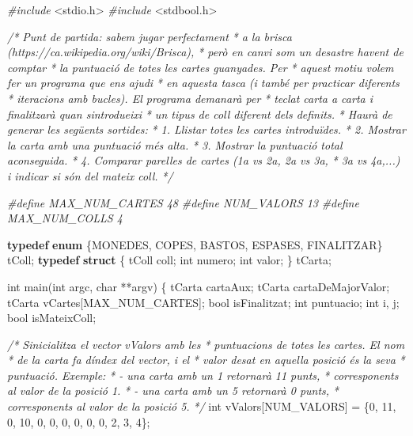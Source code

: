 \documentclass[
]{book}
\newenvironment{Shaded}{\begin{snugshade}}{\end{snugshade}}
\newcommand{\CommentTok}[1]{\textcolor[rgb]{0.56,0.35,0.01}{\textit{#1}}}
\newcommand{\DataTypeTok}[1]{\textcolor[rgb]{0.13,0.29,0.53}{#1}}
\newcommand{\DecValTok}[1]{\textcolor[rgb]{0.00,0.00,0.81}{#1}}
\newcommand{\ImportTok}[1]{#1}
\newcommand{\KeywordTok}[1]{\textcolor[rgb]{0.13,0.29,0.53}{\textbf{#1}}}
\newcommand{\NormalTok}[1]{#1}
\newcommand{\PreprocessorTok}[1]{\textcolor[rgb]{0.56,0.35,0.01}{\textit{#1}}}
\begin{document}
\begin{Shaded}
\begin{Highlighting}[]
\PreprocessorTok{\#include }\ImportTok{\textless{}stdio.h\textgreater{}}
\PreprocessorTok{\#include }\ImportTok{\textless{}stdbool.h\textgreater{}}

\CommentTok{/* Punt de partida: sabem jugar perfectament}
\CommentTok{ * a la brisca (https://ca.wikipedia.org/wiki/Brisca), }
\CommentTok{ * però en canvi som un desastre havent de comptar}
\CommentTok{ * la puntuació de totes les cartes guanyades. Per}
\CommentTok{ * aquest motiu volem fer un programa que ens ajudi}
\CommentTok{ * en aquesta tasca (i també per practicar diferents}
\CommentTok{ * iteracions amb bucles). El programa demanarà per }
\CommentTok{ * teclat carta a carta i finalitzarà quan s\textquotesingle{}introdueixi}
\CommentTok{ * un tipus de coll diferent dels definits.}
\CommentTok{ * Haurà de generar les següents sortides:}
\CommentTok{ * 1. Llistar totes les cartes introduïdes.}
\CommentTok{ * 2. Mostrar la carta amb una puntuació més alta.}
\CommentTok{ * 3. Mostrar la puntuació total aconseguida.}
\CommentTok{ * 4. Comparar parelles de cartes (1a vs 2a, 2a vs 3a,}
\CommentTok{ *    3a vs 4a,...) i indicar si són del mateix coll.}
\CommentTok{ */}

\PreprocessorTok{\#define MAX\_NUM\_CARTES 48}
\PreprocessorTok{\#define NUM\_VALORS 13}
\PreprocessorTok{\#define MAX\_NUM\_COLLS 4}

\KeywordTok{typedef} \KeywordTok{enum}\NormalTok{ \{MONEDES, COPES, BASTOS, ESPASES, FINALITZAR\} tColl;}
\KeywordTok{typedef} \KeywordTok{struct}\NormalTok{ \{}
\NormalTok{    tColl coll;}
    \DataTypeTok{int}\NormalTok{ numero;}
    \DataTypeTok{int}\NormalTok{ valor;}
\NormalTok{\} tCarta;}

\DataTypeTok{int}\NormalTok{ main(}\DataTypeTok{int}\NormalTok{ argc, }\DataTypeTok{char}\NormalTok{ **argv) \{}
\NormalTok{    tCarta cartaAux;}
\NormalTok{    tCarta cartaDeMajorValor;}
\NormalTok{    tCarta vCartes[MAX\_NUM\_CARTES];}
    \DataTypeTok{bool}\NormalTok{ isFinalitzat;}
    \DataTypeTok{int}\NormalTok{ puntuacio;}
    \DataTypeTok{int}\NormalTok{ i, j;}
    \DataTypeTok{bool}\NormalTok{ isMateixColl;}
    
    \CommentTok{/* S\textquotesingle{}inicialitza el vector vValors amb les}
\CommentTok{     * puntuacions de totes les cartes. El nom}
\CommentTok{     * de la carta fa d\textquotesingle{}índex del vector, i el}
\CommentTok{     * valor desat en aquella posició és la seva}
\CommentTok{     * puntuació. Exemple: }
\CommentTok{     * {-} una carta amb un 1 retornarà 11 punts,}
\CommentTok{     *   corresponents al valor de la posició 1.}
\CommentTok{     * {-} una carta amb un 5 retornarà 0 punts,}
\CommentTok{     *   corresponents al valor de la posició 5.}
\CommentTok{     */}
    \DataTypeTok{int}\NormalTok{ vValors[NUM\_VALORS] = \{}\DecValTok{0}\NormalTok{, }\DecValTok{11}\NormalTok{, }\DecValTok{0}\NormalTok{, }\DecValTok{10}\NormalTok{, }\DecValTok{0}\NormalTok{, }\DecValTok{0}\NormalTok{, }\DecValTok{0}\NormalTok{, }\DecValTok{0}\NormalTok{, }\DecValTok{0}\NormalTok{, }\DecValTok{0}\NormalTok{, }\DecValTok{2}\NormalTok{, }\DecValTok{3}\NormalTok{, }\DecValTok{4}\NormalTok{\};}


\end{Highlighting}
\end{Shaded}
\end{document}
